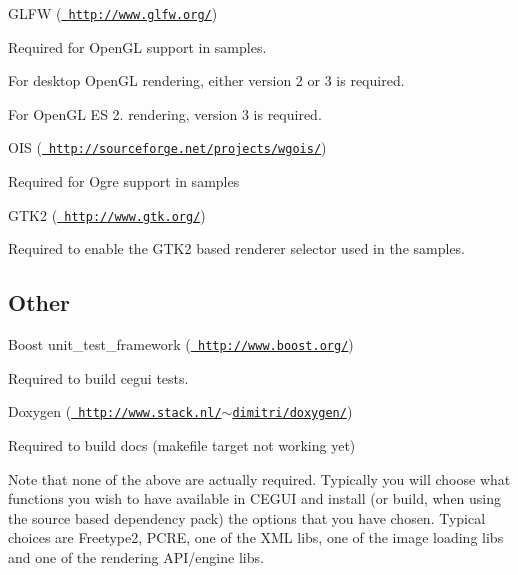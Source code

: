 \begin{DoxyItemize}
\item G\+L\+FW (\href{http://www.glfw.org/}{\texttt{ http\+://www.\+glfw.\+org/}})
\begin{DoxyItemize}
\item Required for Open\+GL support in samples.
\item For desktop Open\+GL rendering, either version 2 or 3 is required.
\item For Open\+GL ES 2. rendering, version 3 is required.
\end{DoxyItemize}
\item O\+IS (\href{http://sourceforge.net/projects/wgois/}{\texttt{ http\+://sourceforge.\+net/projects/wgois/}})
\begin{DoxyItemize}
\item Required for Ogre support in samples
\end{DoxyItemize}
\item G\+T\+K2 (\href{http://www.gtk.org/}{\texttt{ http\+://www.\+gtk.\+org/}})
\begin{DoxyItemize}
\item Required to enable the G\+T\+K2 based renderer selector used in the samples.
\end{DoxyItemize}
\end{DoxyItemize}\hypertarget{dependencies_dependencies_other}{}\subsection{Other}\label{dependencies_dependencies_other}

\begin{DoxyItemize}
\item Boost unit\+\_\+test\+\_\+framework (\href{http://www.boost.org/}{\texttt{ http\+://www.\+boost.\+org/}})
\begin{DoxyItemize}
\item Required to build cegui tests.
\end{DoxyItemize}
\item Doxygen (\href{http://www.stack.nl/~dimitri/doxygen/}{\texttt{ http\+://www.\+stack.\+nl/$\sim$dimitri/doxygen/}})
\begin{DoxyItemize}
\item Required to build docs (makefile target not working yet)
\end{DoxyItemize}
\end{DoxyItemize}

Note that none of the above are actually required. Typically you will choose what functions you wish to have available in C\+E\+G\+UI and install (or build, when using the source based dependency pack) the options that you have chosen. Typical choices are Freetype2, P\+C\+RE, one of the X\+ML libs, one of the image loading libs and one of the rendering A\+P\+I/engine libs. 